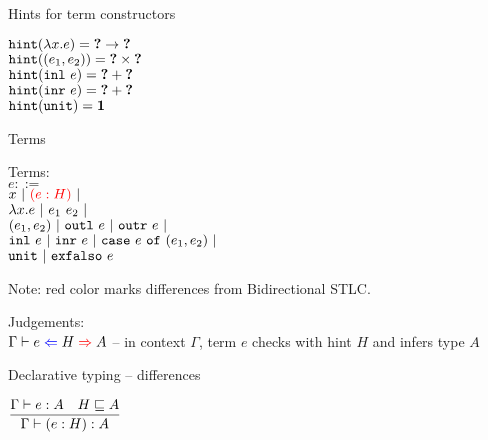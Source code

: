 \documentclass{beamer}
\begin{document}
\begin{frame}{Hints for term constructors}

\begin{center}
  $\texttt{hint}(\lambda x. e) = \textbf{?} \to \textbf{?}$ \\
  $\texttt{hint}((e_1, e_2)) = \textbf{?} \times \textbf{?}$ \\
  $\texttt{hint}(\texttt{inl}\ e) = \textbf{?} + \textbf{?}$ \\
  $\texttt{hint}(\texttt{inr}\ e) = \textbf{?} + \textbf{?}$ \\
  $\texttt{hint}(\texttt{unit}) = \textbf{1}$
\end{center}

\end{frame}

\begin{frame}{Terms}

Terms: \\
$e ::=$ \\
\qquad $x \pipe \termdiff{\annot{e}{H}} \pipe $ \\
\qquad $\lambda x. e \ |\  e_1\ e_2 \ |\ $ \\
\qquad $(e_1, e_2) \ |\  \texttt{outl}\ e \ |\  \texttt{outr}\ e \ |\ $ \\
\qquad $\texttt{inl}\ e \ |\  \texttt{inr}\ e \ |\  \texttt{case}\ e\ \texttt{of}\ (e_1, e_2) \ |\ $ \\
\qquad $\texttt{unit} \ |\  \texttt{exfalso}\ e$

\vspace{2em}

Note: red color marks differences from Bidirectional STLC.

\vspace{2em}

Judgements: \\
$\fullhinting{\Gamma}{e}{H}{A}$ -- in context $\Gamma$, term $e$ checks with hint $H$ and infers type $A$

\end{frame}

\begin{frame}{Declarative typing -- differences}

\begin{center}
  $\displaystyle \frac{\Gamma \vdash e : A \quad H \sqsubseteq A}{\Gamma \vdash (e : H) : A} \textsc{\footnotesize{}}$
\end{center}

\end{frame}
\end{document}
